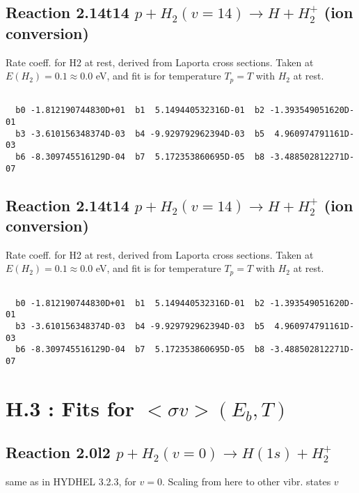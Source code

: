 \documentclass[12pt,dvipdfmx]{article}
\begin{document}
\newpage
\subsection{
Reaction 2.14t14
$ p + H_2(v=14) \rightarrow H + H_2^+$ (ion conversion)
}
Rate coeff. for H2 at rest, derived from Laporta cross sections.
Taken at $E(H_2) = 0.1 \approx 0.0$ eV,  and fit is for temperature $T_p=T$ with $H_2$ at rest.

\begin{small}\begin{verbatim}

  b0 -1.812190744830D+01  b1  5.149440532316D-01  b2 -1.393549051620D-01
  b3 -3.610156348374D-03  b4 -9.929792962394D-03  b5  4.960974791161D-03
  b6 -8.309745516129D-04  b7  5.172353860695D-05  b8 -3.488502812271D-07

\end{verbatim}\end{small}

\newpage
\subsection{
Reaction 2.14t14
$ p + H_2(v=14) \rightarrow H + H_2^+$ (ion conversion)
}
Rate coeff. for H2 at rest, derived from Laporta cross sections.
Taken at $E(H_2) = 0.1 \approx 0.0$ eV,  and fit is for temperature $T_p=T$ with $H_2$ at rest.

\begin{small}\begin{verbatim}

  b0 -1.812190744830D+01  b1  5.149440532316D-01  b2 -1.393549051620D-01
  b3 -3.610156348374D-03  b4 -9.929792962394D-03  b5  4.960974791161D-03
  b6 -8.309745516129D-04  b7  5.172353860695D-05  b8 -3.488502812271D-07

\end{verbatim}\end{small}

\newpage


\newpage
\section{H.3 :  Fits for $<\sigma v> (E_b,T)$}

\subsection{
Reaction 2.0l2 $   p + H_2(v=0) \rightarrow H(1s) + H_2^+$}
same as in HYDHEL 3.2.3, for $v=0$. Scaling from here to other vibr. states $v$
\end{document}
